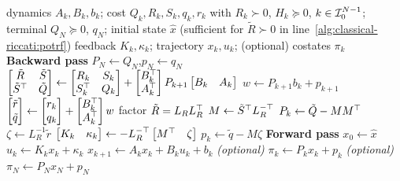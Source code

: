 \begin{algorithm}[t]
\caption{Classical Riccati recursion}
\label{alg:classical-riccati}
\begin{algorithmic}[1]
\Require dynamics $A_k, B_k, b_k$; cost $Q_k, R_k, S_k, q_k, r_k$ with $R_k \succ 0$, $H_k \succeq 0$, $k \in \mathcal{I}_{0}^{N-1}$;
         terminal $Q_N \succeq 0$, $q_N$; initial state $\hat{x}$
         (sufficient for $\tilde{R} \succ 0$ in line~\ref{alg:classical-riccati:potrf})
\Ensure feedback $K_k, \kappa_k$; trajectory $x_k, u_k$; (optional) costates $\pi_k$
\Statex \textbf{Backward pass}
\State $P_N \gets Q_N$,\quad $p_N \gets q_N$
\State $\begin{bmatrix} \tilde{R} & \tilde{S} \\ \tilde{S}^\top & \tilde{Q} \end{bmatrix} \gets
\begin{bmatrix} R_k & S_k \\ S_k^\top & Q_k \end{bmatrix}
+ \begin{bmatrix} B_k^\top \\ A_k^\top \end{bmatrix} P_{k+1} \begin{bmatrix} B_k & A_k \end{bmatrix}$
\State $w \gets P_{k+1} b_k + p_{k+1}$
\State $\begin{bmatrix} \tilde r \\ \tilde q \end{bmatrix} \gets
\begin{bmatrix} r_k \\ q_k \end{bmatrix}
+ \begin{bmatrix} B_k^\top \\ A_k^\top \end{bmatrix} w$
\State factor $\tilde{R} = L_R L_R^\top$
\label{alg:classical-riccati:potrf}
\State $M \gets \tilde{S}^\top L_R^{-\top}$
\State $P_k \gets \tilde{Q} - M M^\top$
\State $\zeta \gets L_R^{-1}\tilde r$
\State $\begin{bmatrix} K_k & \kappa_k \end{bmatrix} \gets
-L_R^{-\top} \begin{bmatrix} M^\top & \zeta \end{bmatrix}$
\State $p_k \gets \tilde q - M\zeta$
\EndFor
\Statex \textbf{Forward pass}
\State $x_0 \gets \hat{x}$
\State $u_k \gets K_k x_k + \kappa_k$
\State $x_{k+1} \gets A_k x_k + B_k u_k + b_k$
\State \textit{(optional)}\; $\pi_k \gets P_k x_k + p_k$
\EndFor
\State \textit{(optional)}\; $\pi_N \gets P_N x_N + p_N$
\end{algorithmic}
\end{algorithm}

